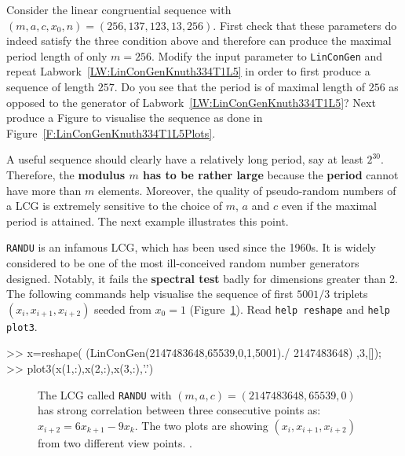 \begin{labwork}
Consider the linear congruential sequence with $(m,a,c,x_0,n)= (256,137,123,13,256)$.  First check that these parameters do indeed satisfy the three condition above and therefore can produce the maximal period length of only $m=256$.  Modify the input parameter to {\tt LinConGen} and repeat Labwork~\ref{LW:LinConGenKnuth334T1L5} in order to first produce a sequence of length $257$.  Do you see that the period is of maximal length of $256$ as opposed to the generator of Labwork~\ref{LW:LinConGenKnuth334T1L5}?  Next produce a Figure to visualise the sequence as done in Figure~\ref{F:LinConGenKnuth334T1L5Plots}.
\end{labwork}

A useful sequence should clearly have a relatively long period, say at least $2^{30}$.  Therefore, the {\bf modulus $m$ has to be rather large} because the {\bf period} cannot have more than $m$ elements.  Moreover, the quality of pseudo-random numbers of a LCG is extremely sensitive to the choice of $m$, $a$ and $c$ even if the maximal period is attained.  The next example illustrates this point.

\begin{labwork}\label{LW:RANDU}
{\tt RANDU} is an infamous LCG, which has been used since the 1960s.  It is widely considered to be one of the most ill-conceived random number generators designed. Notably, it fails the {\bf spectral test} badly for dimensions greater than 2.  The following commands help visualise the sequence of first $5001/3$ triplets $(x_i,x_{i+1},x_{i+2})$ seeded from $x_0=1$ (Figure~\ref{F:RANDU3D5001pts}).  Read {\tt help reshape} and {\tt help plot3}. 
\begin{VrbM}
>> x=reshape( (LinConGen(2147483648,65539,0,1,5001)./ 2147483648) ,3,[]);
>> plot3(x(1,:),x(2,:),x(3,:),'.')
\end{VrbM}
\end{labwork}

\begin{figure}[htbp]
\caption{The LCG called {\tt RANDU} with $(m,a,c)=(2147483648,65539,0)$ has strong correlation between three consecutive points as: $x_{i+2}=6x_{k+1}-9x_k$.  The two plots are showing $(x_i,x_{i+1},x_{i+2})$ from two different view points.
.\label{F:RANDU3D5001pts}}
\centering   {}
\end{figure}

